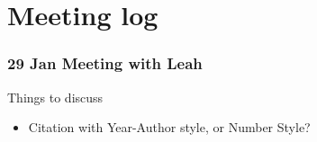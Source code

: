 \chapter{Meeting log}

\subsection{29 Jan Meeting with Leah}
Things to discuss
\begin{itemize}
	\item Citation with Year-Author style, or Number Style?
\end{itemize}